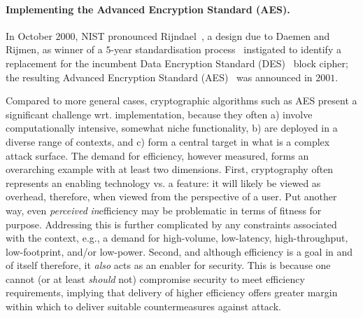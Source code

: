 
\paragraph{Implementing the Advanced Encryption Standard (AES).}

In October $2000$, NIST pronounced Rijndael~\cite{DaeRij:98,DaeRij:02}, 
a design due to Daemen and Rijmen, 
as winner of a $5$-year standardisation process~\cite{NBBBDFR:01} instigated 
to identify a replacement for the incumbent
Data     Encryption Standard (DES)~\cite{FIPS:46} 
block cipher; the resulting 
Advanced Encryption Standard (AES)~\cite{FIPS:197} 
was announced in $2001$.

Compared to more general cases, cryptographic algorithms such as AES present a
significant challenge wrt. implementation, because they often
a) involve computationally intensive, somewhat niche functionality,
b) are deployed in a diverse range of contexts,
   and
c) form a central target in what is a complex attack surface.
The demand for efficiency, however measured, forms an overarching example
with at least two dimensions.
First,
cryptography often represents an enabling technology vs. a feature: it will
likely be viewed as overhead, therefore, when viewed from the perspective 
of a user.  Put another way,  even {\em perceived} {\em in}efficiency may
be problematic in terms of fitness for purpose.  Addressing this is further 
complicated by any constraints associated with the context, e.g., a demand 
for
high-volume, 
 low-latency, 
high-throughput, 
 low-footprint, 
and/or 
 low-power.
Second,
and although efficiency is a goal in and of itself therefore, it {\em also} 
acts as an enabler for security.  This is because one cannot 
(or at least {\em should} not) 
compromise security to meet efficiency requirements, implying that delivery 
of higher efficiency offers greater margin within which to deliver suitable
countermeasures against attack.

